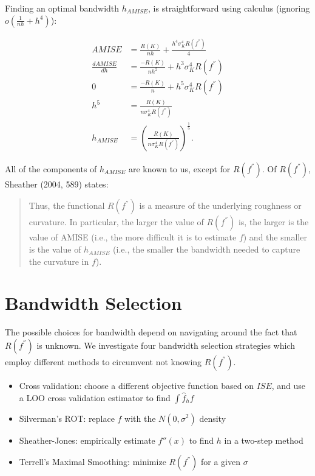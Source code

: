 \documentclass[]{article}
\begin{document}
Finding an optimal bandwidth \(h_{AMISE}\), is straightforward using
calculus (ignoring \(o\left(\frac{1}{nh} + h^4\right)\)):

\[
\begin{aligned}
AMISE &= \frac{R(K)}{nh} + \frac{h^4\sigma_K^4R(f^{''})}{4}\\
\frac{dAMISE}{dh} &= \frac{-R(K)}{nh^2} + h^3\sigma_K^4 R(f^{''})\\
0 &= \frac{-R(K)}{n} + h^5 \sigma_K^4 R(f^{''}) \\
h^5 &= \frac{R(K)}{n\sigma_K^4 R(f^{''})} \\
h_{AMISE} &= \left(\frac{R(K)}{n\sigma_K^4R(f^{''})}\right)^{\frac{1}{5}}.
\end{aligned}
\]

All of the components of \(h_{AMISE}\) are known to us, except for
\(R(f^{''})\). Of \(R(f^{''})\), Sheather (2004, 589) states:

\begin{quote}
Thus, the functional \(R(f^{''})\) is a measure of the underlying
roughness or curvature. In particular, the larger the value of
\(R(f^{''})\) is, the larger is the value of AMISE (i.e., the more
difficult it is to estimate \(f\)) and the smaller is the value of
\(h_{AMISE}\) (i.e., the smaller the bandwidth needed to capture the
curvature in \(f\)).
\end{quote}

\section{Bandwidth Selection}\label{bandwidth-selection}

The possible choices for bandwidth depend on navigating around the fact
that \(R(f^{''})\) is unknown. We investigate four bandwidth selection
strategies which employ different methods to circumvent not knowing
\(R(f^{''})\).

\begin{itemize}
\item
  Cross validation: choose a different objective function based on
  \(ISE\), and use a LOO cross validation estimator to find
  \(\int \hat{f}_h f\)
\item
  Silverman's ROT: replace \(f\) with the \(N(0, \sigma^2)\) density
\item
  Sheather-Jones: empirically estimate \(f''(x)\) to find \(h\) in a
  two-step method
\item
  Terrell's Maximal Smoothing: minimize \(R(f^{''})\) for a given
  \(\sigma\)
\end{itemize}
\end{document}
